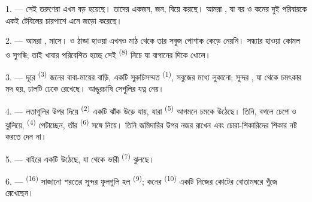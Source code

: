 %

\VUsaut{4.0mm}
\VUsaut{1.6mm}
\VUsaut{3.2mm}

\VUsaut{1.6mm}
\VUsaut{2.6mm}

\VUsaut{3.0mm}

1. --- সেই তরুণেরা এখন বড় হয়েছে। তাদের একজন, জন, বিয়ে করছে। আমরা
, যা বর ও কনের দুই পরিবারকে একই টেবিলের চারপাশে এনে
জড়ো করেছে।

2. --- আমরা ,  মাসে।  ও
 ঠান্ডা হাওয়া এখনও মাঠ থেকে তার সবুজ পোশাক কেড়ে নেয়নি।
সন্ধ্যার হাওয়া কোমল ও সুগন্ধি; তাই খাবার পরিবেশিত হচ্ছে সেই
 \textsuperscript{(8)} নিচে যা বাগানের দিকে খোলে।

3. --- দূরে  \textsuperscript{(3)} জনের বাবা-মায়ের বাড়ি, একটি
সুরুচিসম্মত  \textsuperscript{(1)}, সবুজের মধ্যে লুকানো;
সুন্দর , যা থেকে চমৎকার মদ হয়, ঢালটি ঢেকে রেখেছে।
আঙুরচাষি সেগুলির যত্ন নেয়।

4. --- লতাগুলির উপর দিয়ে  \textsuperscript{(2)} একটি ঝাঁক উড়ে
যায়, যারা  \textsuperscript{(5)} আগমনে চমকে উঠেছে। তিনি,
বগলে  চেপে ও  ঝুলিয়ে,
 \textsuperscript{(4)} পেটাচ্ছেন, তাঁর 
\textsuperscript{(6)} সঙ্গে নিয়ে। তিনি জমিদারির উপর নজর রাখেন এবং চোরা-শিকারিদের
শিকার নষ্ট করতে দেন না।

5. ---  বাইরে একটি  উঠেছে, যা থেকে ভারী
 \textsuperscript{(7)} ঝুলছে।

6. ---  \textsuperscript{(16)} সাজানো শরতের সুন্দর ফুলগুলি হল
 \textsuperscript{(9)}; কনের 
\textsuperscript{(10)} একটি নিজের কোটের বোতামঘরে গুঁজে রেখেছেন।

